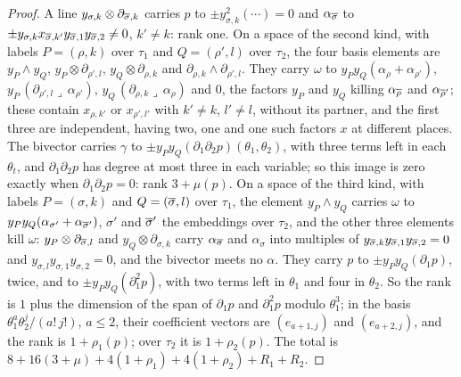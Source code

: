 \begin{proof}
A line $y_{\sigma,k}\otimes\partial_{\overline{\sigma},k}$ carries $p$ to
$\pm y_{\sigma,k}^{2}(\cdots)=0$ and $\alpha_{\overline{\sigma}}$ to
$\pm y_{\sigma,k}x_{\overline{\sigma},k'}y_{\overline{\sigma},1}y_{\overline{\sigma},2}\ne0$,
$k'\ne k$: rank one. On a space of the second kind, with labels
$P=(\rho,k)$ over $\tau_{1}$ and $Q=(\rho',l)$ over $\tau_{2}$, the four basis
elements are $y_{P}\wedge y_{Q}$, $y_{P}\otimes\partial_{\rho',l}$,
$y_{Q}\otimes\partial_{\rho,k}$ and $\partial_{\rho,k}\wedge\partial_{\rho',l}$.
They carry $\omega$ to $y_{P}y_{Q}(\alpha_{\rho}+\alpha_{\rho'})$,
$y_{P}\,(\partial_{\rho',l}\lrcorner\,\alpha_{\rho'})$,
$y_{Q}\,(\partial_{\rho,k}\lrcorner\,\alpha_{\rho})$ and $0$, the factors $y_{P}$
and $y_{Q}$ killing $\alpha_{\overline{\rho}}$ and $\alpha_{\overline{\rho}'}$; these
contain $x_{\rho,k'}$ or $x_{\rho',l'}$ with $k'\ne k$, $l'\ne l$, without its
partner, and the first three are independent, having two, one and one such
factors $x$ at different places. The bivector carries $\gamma$ to
$\pm y_{P}y_{Q}(\partial_{1}\partial_{2}p)(\theta_{1},\theta_{2})$, with three
terms left in each $\theta_{t}$, and $\partial_{1}\partial_{2}p$ has degree at
most three in each variable; so this image is zero exactly when
$\partial_{1}\partial_{2}p=0$: rank $3+\mu(p)$. On a space of the third kind,
with labels $P=(\sigma,k)$ and $Q=(\overline{\sigma},l)$ over $\tau_{1}$, the element
$y_{P}\wedge y_{Q}$ carries $\omega$ to $y_{P}y_{Q}(\alpha_{\sigma'}+
\alpha_{\overline{\sigma}'})$, $\sigma'$ and $\overline{\sigma}'$ the embeddings over
$\tau_{2}$, and the other three elements kill $\omega$: $y_{P}\otimes
\partial_{\overline{\sigma},l}$ and $y_{Q}\otimes\partial_{\sigma,k}$ carry
$\alpha_{\overline{\sigma}}$ and $\alpha_{\sigma}$ into multiples of
$y_{\overline{\sigma},k}y_{\overline{\sigma},1}y_{\overline{\sigma},2}=0$ and
$y_{\sigma,l}y_{\sigma,1}y_{\sigma,2}=0$, and the bivector meets no
$\alpha$. They carry $p$ to $\pm y_{P}y_{Q}(\partial_{1}p)$, twice, and to
$\pm y_{P}y_{Q}(\partial_{1}^{2}p)$, with two terms left in $\theta_{1}$ and
four in $\theta_{2}$. So the rank is $1$ plus the dimension of the span of
$\partial_{1}p$ and $\partial_{1}^{2}p$ modulo $\theta_{1}^{3}$; in the basis
$\theta_{1}^{a}\theta_{2}^{j}/(a!\,j!)$, $a\le2$, their coefficient vectors are
$(e_{a+1,j})$ and $(e_{a+2,j})$, and the rank is $1+\rho_{1}(p)$; over
$\tau_{2}$ it is $1+\rho_{2}(p)$. The total is
$8+16(3+\mu)+4(1+\rho_{1})+4(1+\rho_{2})+R_{1}+R_{2}$.


\end{proof}
